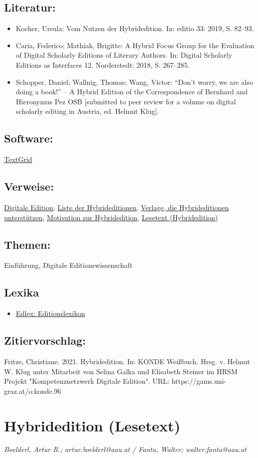 \documentclass{article}
\begin{document}
        \subsection*{Literatur:}\begin{itemize}\item Kocher, Ursula: Vom Nutzen der Hybridedition. In: editio 33: 2019, S. 82–93.\item Caria, Federico; Mathiak, Brigitte: A Hybrid Focus Group for the Evaluation of Digital Scholarly Editions of Literary Authors. In: Digital Scholarly Editions as Interfaces 12. Norderstedt: 2018, S. 267–285.\item Schopper, Daniel; Wallnig, Thomas; Wang, Victor: “Don’t worry, we are also doing a book!” – A Hybrid Edition of the Correspondence of Bernhard and Hieronymus Pez OSB [submitted to peer review for a volume on digital scholarly editing in Austria, ed. Helmut Klug].\end{itemize}\subsection*{Software:}\href{https://textgrid.de/}{TextGrid}\subsection*{Verweise:}\href{https://gams.uni-graz.at/o:konde.59}{Digitale Edition}, \href{https://gams.uni-graz.at/o:konde.117}{Liste der Hybrideditionen}, \href{https://gams.uni-graz.at/o:konde.208}{Verlage, die Hybrideditionen unterstützen}, \href{https://gams.uni-graz.at/o:konde.138}{Motivation zur Hybridedition}, \href{https://gams.uni-graz.at/o:konde.22}{Lesetext (Hybridedition)}\subsection*{Themen:}Einführung, Digitale Editionswissenschaft\subsection*{Lexika}\begin{itemize}\item \href{https://edlex.de/index.php?title=Hybrid-Edition}{Edlex: Editionslexikon}\end{itemize}\subsection*{Zitiervorschlag:}Fritze, Christiane. 2021. Hybridedition. In: KONDE Weißbuch. Hrsg. v. Helmut W. Klug unter Mitarbeit von Selina Galka und Elisabeth Steiner im HRSM Projekt "Kompetenznetzwerk Digitale Edition". URL: https://gams.uni-graz.at/o:konde.96\newpage\section*{Hybridedition (Lesetext)} \emph{Boelderl, Artur R.; artur.boelderl@aau.at / Fanta, Walter;
                  walter.fanta@aau.at}\\
        
\end{document}
